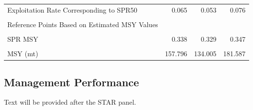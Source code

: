 \documentclass[
  english,
  a4paper,
]{article}
\begin{document}
\begin{table}[H]
\begin{tabular}[t]{lrrr}
Exploitation Rate Corresponding to SPR50 & 0.065 & 0.053 & 0.076\\
\cellcolor{gray!6}{Yield with SPR50 at SB SPR (mt)} & \cellcolor{gray!6}{140.884} & \cellcolor{gray!6}{120.182} & \cellcolor{gray!6}{161.586}\\
\addlinespace
Reference Points Based on Estimated MSY Values &  &  & \\
\cellcolor{gray!6}{Spawning Output at MSY (SB MSY)} & \cellcolor{gray!6}{297.232} & \cellcolor{gray!6}{238.299} & \cellcolor{gray!6}{356.165}\\
SPR MSY & 0.338 & 0.329 & 0.347\\
\cellcolor{gray!6}{Exploitation Rate Corresponding to SPR MSY} & \cellcolor{gray!6}{0.109} & \cellcolor{gray!6}{0.090} & \cellcolor{gray!6}{0.128}\\
MSY (mt) & 157.796 & 134.005 & 181.587\\
\bottomrule
\end{tabular}
\end{table}

\hypertarget{management-performance}{%
\subsection*{Management Performance}\label{management-performance}}

Text will be provided after the STAR panel.
\end{document}
